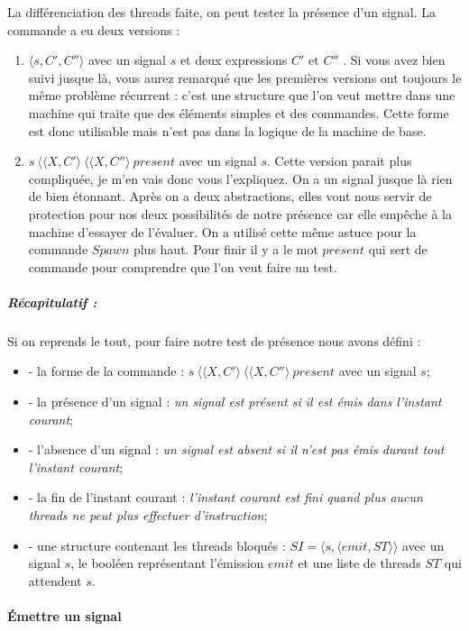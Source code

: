 \documentclass[10pt,a4paper]{report}
\begin{document}
La différenciation des threads faite, on peut tester la présence d'un signal. La commande a eu deux versions :
\begin{enumerate}
\item $\langle s,C',C''\rangle$ avec un signal $s$ et deux expressions $C'$ et $C''$ . Si vous avez bien suivi jusque là, vous aurez remarqué que les premières versions ont toujours le même problème récurrent : c'est une structure que l'on veut mettre dans une machine qui traite que des éléments simples et des commandes. Cette forme est donc utilisable mais n'est pas dans la logique de la machine de base.
\item $s~\langle\langle X,C'\rangle~\langle\langle X,C''\rangle~present$ avec un signal $s$. Cette version parait plus compliquée, je m'en vais donc vous l'expliquez. On a un signal jusque là rien de bien étonnant. Après on a deux abstractions, elles vont nous servir de protection pour nos deux possibilités de notre présence car elle empêche à la machine d'essayer de l'évaluer. On a utilisé cette même astuce pour la commande $Spawn$ plus haut. Pour finir il y a le mot $present$ qui sert de commande pour comprendre que l'on veut faire un test.
\end{enumerate} 
\bigbreak


\subparagraph{Récapitulatif :} Si on reprends le tout, pour faire notre test de présence nous avons défini :
\begin{itemize}
\item[] - la forme de la commande : $s~\langle\langle X,C'\rangle~\langle\langle X,C''\rangle~present$ avec un signal $s$;
\item[] - la présence d'un signal : \textit{un signal est présent si il est émis dans l'instant courant};
\item[] - l'absence d'un signal : \textit{un signal est absent si il n'est pas émis durant tout l'instant courant};
\item[] - la fin de l'instant courant : \textit{l'instant courant est fini quand plus aucun threads ne peut plus effectuer d'instruction};
\item[] - une structure contenant les threads bloqués : $SI = \langle s , \langle emit , ST \rangle\rangle$ avec un signal $s$, le booléen représentant l'émission $emit$ et une liste de threads  $ST$ qui attendent $s$.
\end{itemize}
\bigbreak
\bigbreak




\paragraph{Émettre un signal}
\end{document}
